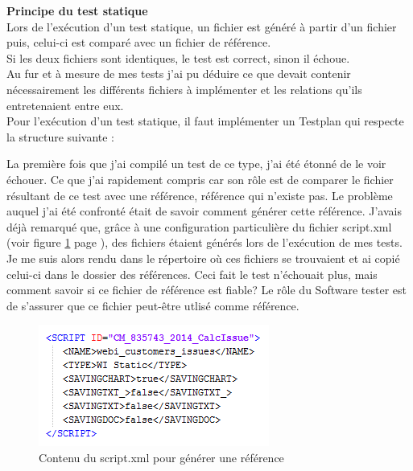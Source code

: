 \textbf{Principe du test statique}\hfill \\ \indent
Lors de l'ex\'{e}cution d'un test statique, un fichier est g\'{e}n\'{e}r\'{e} \`{a} partir d'un fichier puis, celui-ci est compar\'{e} avec un fichier de r\'{e}f\'{e}rence.\\
Si les deux fichiers sont identiques, le test est correct, sinon il \'{e}choue.\\
Au fur et \`{a} mesure de mes tests j'ai pu d\'{e}duire ce que devait contenir n\'{e}cessairement les diff\'{e}rents fichiers \`{a} impl\'{e}menter et les relations qu'ils entretenaient entre eux.\\
Pour l'ex\'{e}cution d'un test statique, il faut impl\'{e}menter un \gls{Testplan} qui respecte la structure suivante :



La premi\`{e}re fois que j'ai compilé un test de ce type, j'ai \'{e}t\'{e} \'{e}tonn\'{e} de le voir \'{e}chouer. Ce que j'ai rapidement compris car son r\^{o}le est de comparer le fichier r\'{e}sultant de ce test avec une r\'{e}f\'{e}rence, r\'{e}f\'{e}rence qui n'existe pas. Le probl\`{e}me auquel j'ai \'{e}t\'{e} confront\'{e} \'{e}tait de savoir comment g\'{e}n\'{e}rer cette r\'{e}f\'{e}rence. J'avais d\'{e}j\`{a} remarqu\'{e} que, gr\^{a}ce \`{a} une configuration particuli\`{e}re du fichier script.xml (voir figure \ref{figure:scriptXmlSavingRef} page \pageref{figure:scriptXmlSavingRef}), des fichiers \'{e}taient g\'{e}n\'{e}r\'{e}s lors de l'ex\'{e}cution de mes tests. Je me suis alors rendu dans le r\'{e}pertoire o\`{u} ces fichiers se trouvaient et ai copié celui-ci dans le dossier des r\'{e}f\'{e}rences. Ceci fait le test n'\'{e}chouait plus, mais comment savoir si ce fichier de r\'{e}f\'{e}rence est fiable? Le r\^{o}le du \gls{Software tester} est de s'assurer que ce fichier peut-\^{e}tre utlis\'{e} comme r\'{e}f\'{e}rence.\\

\begin{figure}[!ht]
  \centering
      \includegraphics{images/scriptXmlSavingRef.png}
  \caption{Contenu du script.xml pour g\'{e}n\'{e}rer une r\'{e}f\'{e}rence}
	\label{figure:scriptXmlSavingRef}
\end{figure}



